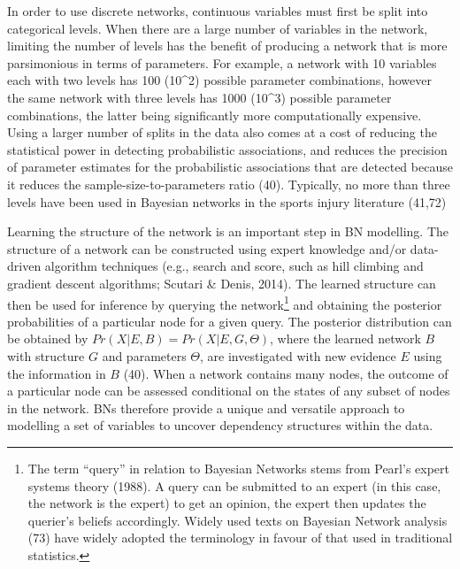 \documentclass[
  english,
  man]{apa6}
\begin{document}
In order to use discrete networks, continuous variables must first be split into categorical levels.
When there are a large number of variables in the network, limiting the number of levels has the benefit of producing a network that is more parsimonious in terms of parameters.
For example, a network with 10 variables each with two levels has 100 (10\^{}2) possible parameter combinations, however the same network with three levels has 1000 (10\^{}3) possible parameter combinations, the latter being significantly more computationally expensive.
Using a larger number of splits in the data also comes at a cost of reducing the statistical power in detecting probabilistic associations, and reduces the precision of parameter estimates for the probabilistic associations that are detected because it reduces the sample-size-to-parameters ratio (40).
Typically, no more than three levels have been used in Bayesian networks in the sports injury literature (41,72)

Learning the structure of the network is an important step in BN modelling.
The structure of a network can be constructed using expert knowledge and/or data-driven algorithm techniques (e.g., search and score, such as hill climbing and gradient descent algorithms; Scutari \& Denis, 2014).
The learned structure can then be used for inference by querying the network\footnote{The term ``query'' in relation to Bayesian Networks stems from Pearl's expert systems theory (1988).
  A query can be submitted to an expert (in this case, the network is the expert) to get an opinion, the expert then updates the querier's beliefs accordingly.
  Widely used texts on Bayesian Network analysis (73) have widely adopted the terminology in favour of that used in traditional statistics.} and obtaining the posterior probabilities of a particular node for a given query.
The posterior distribution can be obtained by \(Pr(X|E,B) = Pr(X|E,G,\Theta)\), where the learned network \(B\) with structure \(G\) and parameters \(\Theta\), are investigated with new evidence \(E\) using the information in \(B\) (40).
When a network contains many nodes, the outcome of a particular node can be assessed conditional on the states of any subset of nodes in the network.
BNs therefore provide a unique and versatile approach to modelling a set of variables to uncover dependency structures within the data.
\end{document}
